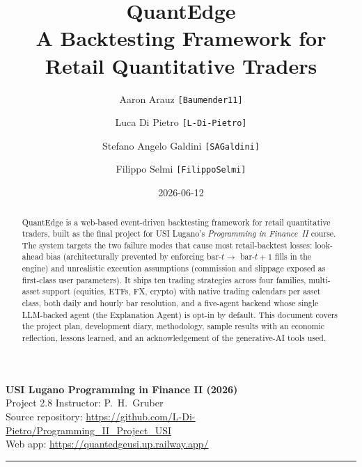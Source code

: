 \documentclass[10pt,a4paper]{article}
\title{%
  \textbf{QuantEdge} \\[4pt]
  \large A Backtesting Framework for Retail Quantitative Traders
}
\author{%
  Aaron Arauz \texttt{[Baumender11]} \and
  Luca Di Pietro \texttt{[L-Di-Pietro]} \and
  Stefano Angelo Galdini \texttt{[SAGaldini]} \and
  Filippo Selmi \texttt{[FilippoSelmi]}
}
\date{2026-06-12}
\begin{document}

\maketitle

\begin{center}
\small
\textbf{USI Lugano \textemdash{} Programming in Finance II (2026)} \\
Project 2.8 \textemdash{} Instructor: P.~H.~Gruber \\
Source repository: \url{https://github.com/L-Di-Pietro/Programming_II_Project_USI} \\
Web app: \url{https://quantedgeusi.up.railway.app/}
\end{center}

\vspace{1em}

\begin{abstract}
\noindent
QuantEdge is a web-based event-driven backtesting framework for retail quantitative
traders, built as the final project for USI Lugano's \emph{Programming in Finance~II}
course. The system targets the two failure modes that cause most retail-backtest losses:
look-ahead bias (architecturally prevented by enforcing bar-$t \to$ bar-$t{+}1$ fills in
the engine) and unrealistic execution assumptions (commission and slippage exposed as
first-class user parameters). It ships ten trading strategies across four families,
multi-asset support (equities, ETFs, FX, crypto) with native trading calendars per asset
class, both daily and hourly bar resolution, and a five-agent backend whose single
LLM-backed agent (the Explanation Agent) is opt-in by default. This document covers the
project plan, development diary, methodology, sample results with an economic
reflection, lessons learned, and an acknowledgement of the generative-AI tools used.
\end{abstract}

\tableofcontents

\vspace{1em}
\hrule
\vspace{1em}








\printbibliography[heading=bibnumbered,title={References}]
\end{document}

